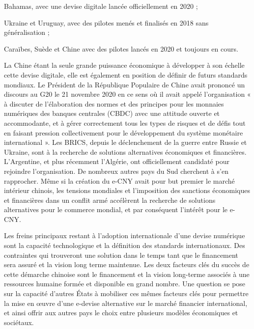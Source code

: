     Bahamas, avec une devise digitale lancée officiellement en 2020 ;

    Ukraine et Uruguay, avec des pilotes menés et finalisés en 2018 sans généralisation ;

    Caraïbes, Suède et Chine avec des pilotes lancés en 2020 et toujours en cours.

La Chine étant la seule grande puissance économique à développer à son échelle cette devise digitale, elle est également en position de définir de futurs standards mondiaux. Le Président de la République Populaire de Chine avait prononcé un discours au G20 le 21 novembre 2020 en ce sens où il avait appelé l’organisation « à discuter de l’élaboration des normes et des principes pour les monnaies numériques des banques centrales (CBDC) avec une attitude ouverte et accommodante, et à gérer correctement tous les types de risques et de défis tout en faisant pression collectivement pour le développement du système monétaire international ». Les BRICS, depuis le déclenchement de la guerre entre Russie et Ukraine, sont à la recherche de solutions alternatives économiques et financières. L’Argentine, et plus récemment l’Algérie, ont officiellement candidaté pour rejoindre l’organisation. De nombreux autres pays du Sud cherchent à s’en rapprocher. Même si la création du e-CNY avait pour but premier le marché intérieur chinois, les tensions mondiales et l’imposition des sanctions économiques et financières dans un conflit armé accélèrent la recherche de solutions alternatives pour le commerce mondial, et par conséquent l’intérêt pour le e-CNY. 

Les freins principaux restant à l’adoption internationale d’une devise numérique sont la capacité technologique et la définition des standards internationaux. Des contraintes qui trouveront une solution dans le temps tant que le financement sera assuré et la vision long terme maintenue. Les deux facteurs clés du succès de cette démarche chinoise sont le financement et la vision long-terme associés à une ressources humaine formée et disponible en grand nombre. Une question se pose sur la capacité d’autres États à mobiliser ces mêmes facteurs clés pour permettre la mise en œuvre d’une e-devise alternative sur le marché financier international, et ainsi offrir aux autres pays le choix entre plusieurs modèles économiques et sociétaux.
